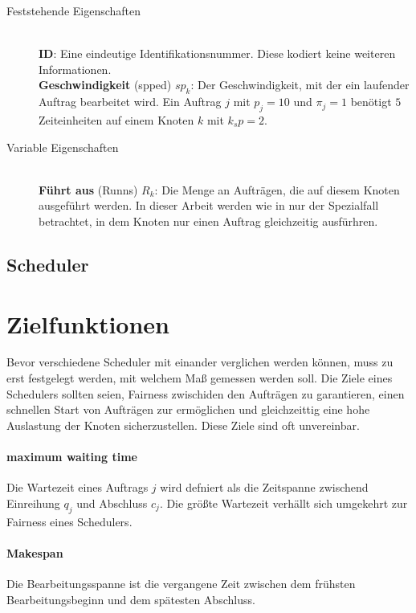 \begin{description}
	\item[Feststehende Eigenschaften] \hfil \\
	\textbf{ID}: Eine eindeutige Identifikationsnummer. Diese kodiert keine weiteren Informationen.\\
	\textbf{Geschwindigkeit} (spped) $sp_k$: Der Geschwindigkeit, mit der ein laufender Auftrag bearbeitet wird. Ein Auftrag $j$ mit $p_j = 10$ und $\pi_j = 1$ benötigt $5$ Zeiteinheiten auf einem Knoten $k$ mit $k_sp = 2$.\\
	\item[Variable Eigenschaften] \hfil \\
	\textbf{Führt aus} (Runns) $R_k$: Die Menge an Aufträgen, die auf diesem Knoten ausgeführt werden. In dieser Arbeit werden wie in \cite{Arn99} nur der Spezialfall betrachtet, in dem Knoten nur einen Auftrag gleichzeitig ausfürhren.\\
\end{description}


\subsection{Scheduler}

\section{Zielfunktionen}
Bevor verschiedene Scheduler mit einander verglichen werden können, muss zu erst festgelegt werden, mit welchem Maß gemessen werden soll. Die Ziele eines Schedulers sollten seien, Fairness zwischiden den Aufträgen zu garantieren, einen schnellen Start von Aufträgen zur ermöglichen und gleichzeittig eine hohe Auslastung der Knoten sicherzustellen. Diese Ziele sind oft unvereinbar.

\paragraph{maximum waiting time}
Die Wartezeit eines Auftrags $j$ wird defniert als die Zeitspanne zwischend Einreihung $q_j$ und Abschluss $c_j$. Die größte Wartezeit verhällt sich umgekehrt zur Fairness eines Schedulers.

\paragraph{Makespan}
Die Bearbeitungsspanne ist die vergangene Zeit zwischen dem frühsten Bearbeitungsbeginn und dem spätesten Abschluss.

